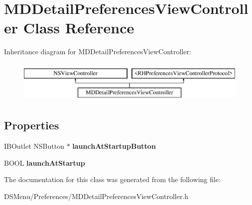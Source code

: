 \hypertarget{interface_m_d_detail_preferences_view_controller}{\section{M\-D\-Detail\-Preferences\-View\-Controller Class Reference}
\label{interface_m_d_detail_preferences_view_controller}
}
Inheritance diagram for M\-D\-Detail\-Preferences\-View\-Controller\-:\begin{figure}[H]
\begin{center}
\leavevmode
\includegraphics[height=2.000000cm]{interface_m_d_detail_preferences_view_controller}
\end{center}
\end{figure}
\subsection*{Properties}
\begin{DoxyCompactItemize}
\item 
\hypertarget{interface_m_d_detail_preferences_view_controller_a1e1d2f0a61e7275f126f549b807e5e8b}{I\-B\-Outlet N\-S\-Button $\ast$ {\bfseries launch\-At\-Startup\-Button}}\label{interface_m_d_detail_preferences_view_controller_a1e1d2f0a61e7275f126f549b807e5e8b}

\item 
\hypertarget{interface_m_d_detail_preferences_view_controller_aeae32b19a1a02e330a74221fa285a883}{B\-O\-O\-L {\bfseries launch\-At\-Startup}}\label{interface_m_d_detail_preferences_view_controller_aeae32b19a1a02e330a74221fa285a883}

\end{DoxyCompactItemize}


The documentation for this class was generated from the following file\-:\begin{DoxyCompactItemize}
\item 
D\-S\-Menu/\-Preferences/M\-D\-Detail\-Preferences\-View\-Controller.\-h\end{DoxyCompactItemize}
